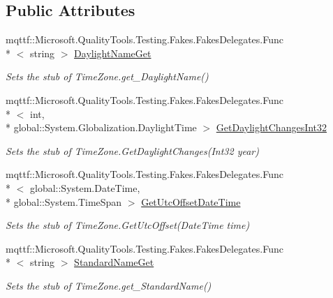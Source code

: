 \subsection*{Public Attributes}
\begin{DoxyCompactItemize}
\item 
mqttf\-::\-Microsoft.\-Quality\-Tools.\-Testing.\-Fakes.\-Fakes\-Delegates.\-Func\\*
$<$ string $>$ \hyperlink{class_system_1_1_fakes_1_1_stub_time_zone_a782f7fad3c8b609efad3cbbc79715828}{Daylight\-Name\-Get}
\begin{DoxyCompactList}\small\item\em Sets the stub of Time\-Zone.\-get\-\_\-\-Daylight\-Name()\end{DoxyCompactList}\item 
mqttf\-::\-Microsoft.\-Quality\-Tools.\-Testing.\-Fakes.\-Fakes\-Delegates.\-Func\\*
$<$ int, \\*
global\-::\-System.\-Globalization.\-Daylight\-Time $>$ \hyperlink{class_system_1_1_fakes_1_1_stub_time_zone_a7601e66ce1591904508fe6c2459fbf9f}{Get\-Daylight\-Changes\-Int32}
\begin{DoxyCompactList}\small\item\em Sets the stub of Time\-Zone.\-Get\-Daylight\-Changes(\-Int32 year)\end{DoxyCompactList}\item 
mqttf\-::\-Microsoft.\-Quality\-Tools.\-Testing.\-Fakes.\-Fakes\-Delegates.\-Func\\*
$<$ global\-::\-System.\-Date\-Time, \\*
global\-::\-System.\-Time\-Span $>$ \hyperlink{class_system_1_1_fakes_1_1_stub_time_zone_aad1d52340603297a8d0f7f30076a4a1d}{Get\-Utc\-Offset\-Date\-Time}
\begin{DoxyCompactList}\small\item\em Sets the stub of Time\-Zone.\-Get\-Utc\-Offset(\-Date\-Time time)\end{DoxyCompactList}\item 
mqttf\-::\-Microsoft.\-Quality\-Tools.\-Testing.\-Fakes.\-Fakes\-Delegates.\-Func\\*
$<$ string $>$ \hyperlink{class_system_1_1_fakes_1_1_stub_time_zone_a0a0443d1968d38e593f0c32cb617c09b}{Standard\-Name\-Get}
\begin{DoxyCompactList}\small\item\em Sets the stub of Time\-Zone.\-get\-\_\-\-Standard\-Name()\end{DoxyCompactList}\item 

\end{DoxyCompactItemize}
